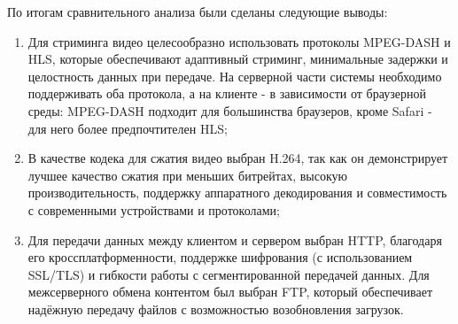 	По итогам сравнительного анализа были сделаны следующие выводы:
	\begin{enumerate}[label=$\bullet$]
		\item Для стриминга видео целесообразно использовать протоколы MPEG-DASH и HLS, которые обеспечивают адаптивный стриминг, минимальные задержки и целостность данных при передаче. На серверной части системы необходимо поддерживать оба протокола, а на клиенте - в зависимости от браузерной среды: MPEG-DASH подходит для большинства браузеров, кроме Safari - для него более предпочтителен HLS;
		\item В качестве кодека для сжатия видео выбран H.264, так как он демонстрирует лучшее качество сжатия при меньших битрейтах, высокую производительность, поддержку аппаратного декодирования и совместимость с современными устройствами и протоколами;
		\item Для передачи данных между клиентом и сервером выбран HTTP, благодаря его кроссплатформенности, поддержке шифрования (с использованием SSL/TLS) и гибкости работы с сегментированной передачей данных. Для межсерверного обмена контентом был выбран FTP, который обеспечивает надёжную передачу файлов с возможностью возобновления загрузок.
	\end{enumerate}

	